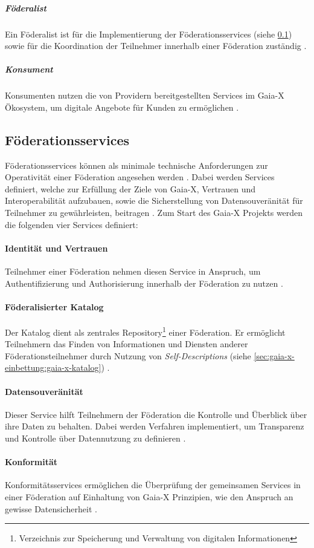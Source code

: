 \subparagraph{Föderalist}
Ein Föderalist ist für die Implementierung der Föderationsservices (siehe \ref{subsec:gaia-x:federationservices}) 
sowie für die Koordination der Teilnehmer innerhalb einer Föderation zuständig \cite{GXFS2021}.

\subparagraph{Konsument}
Konsumenten nutzen die von Providern bereitgestellten Services im Gaia-X Ökosystem, um digitale Angebote für Kunden zu ermöglichen \cite{GaiaXArchitecture2021}.

\subsection{Föderationsservices}
\label{subsec:gaia-x:federationservices}
Föderationsservices können als minimale technische Anforderungen zur Operativität einer Föderation angesehen werden \cite{GXFS2021}.
Dabei werden Services definiert, welche zur Erfüllung der Ziele von Gaia-X, Vertrauen und Interoperabilität
aufzubauen, sowie die Sicherstellung von Datensouveränität für Teilnehmer zu gewährleisten, beitragen \cite{GXFS2021}.
Zum Start des Gaia-X Projekts werden die folgenden vier Services definiert:

\paragraph{Identität und Vertrauen}
Teilnehmer einer Föderation nehmen diesen Service in Anspruch, um Authentifizierung und Authorisierung innerhalb der Föderation zu nutzen \cite{GXFS2021}.

\paragraph{Föderalisierter Katalog}
Der Katalog dient als zentrales 
Repository\footnote{Verzeichnis zur Speicherung und Verwaltung von digitalen Informationen} 
einer Föderation.
Er ermöglicht Teilnehmern das Finden von Informationen und Diensten anderer Föderationsteilnehmer durch Nutzung von
\emph{Self-Descriptions} (siehe \ref{sec:gaia-x-einbettung:gaia-x-katalog}) \cite{GXFS2021}.

\paragraph{Datensouveränität}
Dieser Service hilft Teilnehmern der Föderation die Kontrolle und Überblick über ihre Daten zu behalten.
Dabei werden Verfahren implementiert, um Transparenz und Kontrolle über Datennutzung zu definieren \cite{GXFS2021}.

\paragraph{Konformität}
Konformitätsservices ermöglichen die Überprüfung der gemeinsamen Services in einer Föderation auf Einhaltung
von Gaia-X Prinzipien, wie den Anspruch an gewisse Datensicherheit \cite{GXFS2021}.
